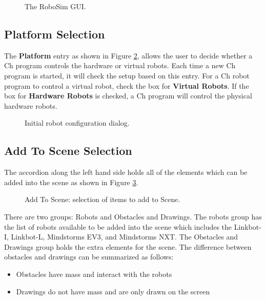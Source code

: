 \documentclass{article}
\begin{document}
\begin{figure}[H]
	\begin{center}
	\end{center}
	\caption{The RoboSim GUI.}
	\label{fig:gui}
\end{figure}

\subsection{Platform Selection}
The {\bf Platform} entry as shown in Figure \ref{fig:platform}, allows the user
to decide whether a Ch program controls the hardware or virtual robots.  Each
time a new Ch program is started, it will check the setup based on this entry.
For a Ch robot program to control a virtual robot, check the box for {\bf
Virtual Robots}.  If the box for {\bf Hardware Robots} is checked, a Ch
program will control the physical hardware robots.
\begin{figure}[H]
	\begin{center}
	\end{center}
	\caption{Initial robot configuration dialog.}
	\label{fig:platform}
\end{figure}

\subsection{Add To Scene Selection}
The accordion along the left hand side holds all of the elements which can be
added into the scene as shown in Figure \ref{fig:add}.
\begin{figure}[H]
	\begin{center}
	\end{center}
	\caption{Add To Scene: selection of items to add to Scene.}
	\label{fig:add}
\end{figure}
There are two groups: Robots and Obstacles and Drawings.  The robots group has
the list of robots available to be added into the scene which includes the
Linkbot-I, Linkbot-L, Mindstorms EV3, and Mindstorms NXT.  The Obstacles and
Drawings group holds the extra elements  for the scene.  The difference between
obstacles and drawings can be summarized as follows:
\begin{itemize}
	\item Obstacles have mass and interact with the robots
	\item Drawings do not have mass and are only drawn on the screen
\end{itemize}
\end{document}
